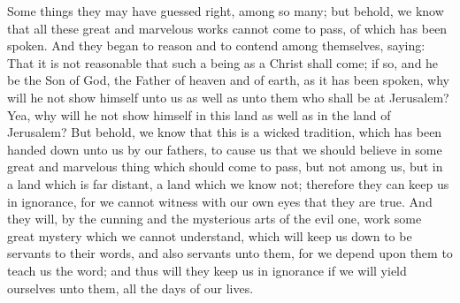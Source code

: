 Some things they may have guessed right, among so many; but behold, we know that all these great and marvelous works cannot come to pass, of which has been spoken.
\bverse \iffalse And they began to reason and to contend among themselves, saying: \fi
And they began to reason and to contend among themselves, saying:
\bverse \iffalse That it is not reasonable that such a being as a Christ shall come; if so, and he be the Son of God, the Father of heaven and of earth, as it has been spoken, why will he not show himself unto us as well as unto them who shall be at Jerusalem? \fi
That it is not reasonable that such a being as a Christ shall come; if so, and he be the Son of God, the Father of heaven and of earth, as it has been spoken, why will he not show himself unto us as well as unto them who shall be at Jerusalem?
\bverse \iffalse Yea, why will he not show himself in this land as well as in the land of Jerusalem? \fi
Yea, why will he not show himself in this land as well as in the land of Jerusalem?
\bverse \iffalse But behold, we know that this is a wicked tradition, which has been handed down unto us by our fathers, to cause us that we should believe in some great and marvelous thing which should come to pass, but not among us, but in a land which is far distant, a land which we know not; therefore they can keep us in ignorance, for we cannot witness with our own eyes that they are true. \fi
But behold, we know that this is a wicked tradition, which has been handed down unto us by our fathers, to cause us that we should believe in some great and marvelous thing which should come to pass, but not among us, but in a land which is far distant, a land which we know not; therefore they can keep us in ignorance, for we cannot witness with our own eyes that they are true.
\bverse \iffalse And they will, by the cunning and the mysterious arts of the evil one, work some great mystery which we cannot understand, which will keep us down to be servants to their words, and also servants unto them, for we depend upon them to teach us the word; and thus will they keep us in ignorance if we will yield ourselves unto them, all the days of our lives. \fi
And they will, by the cunning and the mysterious arts of the evil one, work some great mystery which we cannot understand, which will keep us down to be servants to their words, and also servants unto them, for we depend upon them to teach us the word; and thus will they keep us in ignorance if we will yield ourselves unto them, all the days of our lives.
